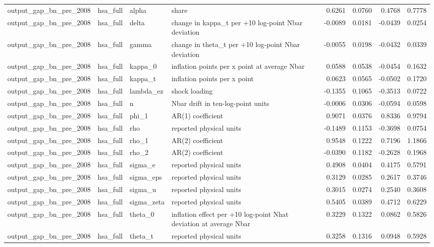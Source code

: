 \begin{tabular}{llllrrrr}
output\_gap\_bn\_pre\_2008 & hsa\_full & alpha & share & 0.6261 & 0.0760 & 0.4768 & 0.7778 \\
output\_gap\_bn\_pre\_2008 & hsa\_full & delta & change in kappa\_t per +10 log-point Nbar deviation & -0.0089 & 0.0181 & -0.0439 & 0.0254 \\
output\_gap\_bn\_pre\_2008 & hsa\_full & gamma & change in theta\_t per +10 log-point Nbar deviation & -0.0055 & 0.0198 & -0.0432 & 0.0339 \\
output\_gap\_bn\_pre\_2008 & hsa\_full & kappa\_0 & inflation points per x point at average Nbar & 0.0588 & 0.0538 & -0.0454 & 0.1632 \\
output\_gap\_bn\_pre\_2008 & hsa\_full & kappa\_t & inflation points per x point & 0.0623 & 0.0565 & -0.0502 & 0.1720 \\
output\_gap\_bn\_pre\_2008 & hsa\_full & lambda\_ez & shock loading & -0.1355 & 0.1065 & -0.3513 & 0.0722 \\
output\_gap\_bn\_pre\_2008 & hsa\_full & n & Nbar drift in ten-log-point units & -0.0006 & 0.0306 & -0.0594 & 0.0598 \\
output\_gap\_bn\_pre\_2008 & hsa\_full & phi\_1 & AR(1) coefficient & 0.9071 & 0.0376 & 0.8336 & 0.9794 \\
output\_gap\_bn\_pre\_2008 & hsa\_full & rho & reported physical units & -0.1489 & 0.1153 & -0.3698 & 0.0754 \\
output\_gap\_bn\_pre\_2008 & hsa\_full & rho\_1 & AR(2) coefficient & 0.9548 & 0.1222 & 0.7196 & 1.1866 \\
output\_gap\_bn\_pre\_2008 & hsa\_full & rho\_2 & AR(2) coefficient & -0.0390 & 0.1182 & -0.2628 & 0.1968 \\
output\_gap\_bn\_pre\_2008 & hsa\_full & sigma\_e & reported physical units & 0.4908 & 0.0404 & 0.4175 & 0.5791 \\
output\_gap\_bn\_pre\_2008 & hsa\_full & sigma\_eps & reported physical units & 0.3129 & 0.0285 & 0.2617 & 0.3746 \\
output\_gap\_bn\_pre\_2008 & hsa\_full & sigma\_u & reported physical units & 0.3015 & 0.0274 & 0.2540 & 0.3608 \\
output\_gap\_bn\_pre\_2008 & hsa\_full & sigma\_zeta & reported physical units & 0.5405 & 0.0389 & 0.4712 & 0.6229 \\
output\_gap\_bn\_pre\_2008 & hsa\_full & theta\_0 & inflation effect per +10 log-point Nhat deviation at average Nbar & 0.3229 & 0.1322 & 0.0862 & 0.5826 \\
output\_gap\_bn\_pre\_2008 & hsa\_full & theta\_t & reported physical units & 0.3258 & 0.1316 & 0.0948 & 0.5928 \\

\end{tabular}
